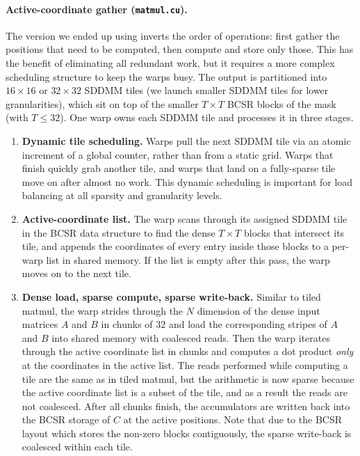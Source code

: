 \documentclass[11pt]{article}
\begin{document}
\paragraph{Active-coordinate gather (\texttt{matmul.cu}).}
The version we ended up using inverts the order of operations: first gather the positions that need to be computed, then compute and store only those. This has the benefit of eliminating all redundant work, but it requires a more complex scheduling structure to keep the warps busy.
The output is partitioned into $16 \times 16$ or $32 \times 32$ SDDMM tiles (we launch smaller SDDMM tiles for lower granularities), which sit on top of the smaller $T \times T$ BCSR blocks of the mask (with $T \le 32$). One warp owns each SDDMM tile and processes it in three stages.

\begin{enumerate}
    \item \textbf{Dynamic tile scheduling.} Warps pull the next SDDMM tile via an atomic increment of a global counter, rather than from a static grid. Warps that finish quickly grab another tile, and warps that land on a fully-sparse tile move on after almost no work. This dynamic scheduling is important for load balancing at all sparsity and granularity levels.
    \item \textbf{Active-coordinate list.} The warp scans through its assigned SDDMM tile in the BCSR data structure to find the dense $T \times T$ blocks that intersect its tile, and appends the coordinates of every entry inside those blocks to a per-warp list in shared memory. If the list is empty after this pass, the warp moves on to the next tile.
    \item \textbf{Dense load, sparse compute, sparse write-back.} Similar to tiled matmul, the warp strides through the $N$ dimension of the dense input matrices $A$ and $B$ in chunks of $32$ and load the corresponding stripes of $A$ and $B$ into shared memory with coalesced reads. Then the warp iterates through the active coordinate list in chunks and computes a dot product \emph{only} at the coordinates in the active list. The reads performed while computing a tile are the same as in tiled matmul, but the arithmetic is now sparse because the active coordinate list is a subset of the tile, and as a result the reads are not coalesced.
    After all chunks finish, the accumulators are written back into the BCSR storage of $C$ at the active positions. Note that due to the BCSR layout which stores the non-zero blocks contiguously, the sparse write-back is coalesced within each tile.
\end{enumerate}
\end{document}
